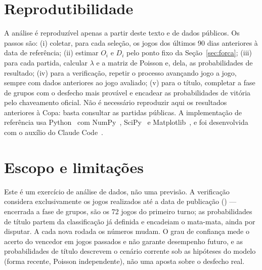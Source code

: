 \documentclass[11pt,a4paper]{article}
\begin{document}
\section{Reprodutibilidade}
A análise é reproduzível apenas a partir deste texto e de dados públicos. Os
passos são: (i) coletar, para cada seleção, os jogos dos últimos 90 dias
anteriores à data de referência; (ii) estimar $O_i$ e $D_i$ pelo ponto fixo da
Seção~\ref{sec:forca}; (iii) para cada partida, calcular $\lambda$ e a matriz de
Poisson e, dela, as probabilidades de resultado; (iv) para a verificação, repetir
o processo avançando jogo a jogo, sempre com dados anteriores ao jogo avaliado;
(v) para o título, completar a fase de grupos com o desfecho mais provável e
encadear as probabilidades de vitória pelo chaveamento oficial. Não é necessário
reproduzir aqui os resultados anteriores à Copa: basta consultar as partidas
públicas. A implementação de referência usa Python~\cite{python} com
NumPy~\cite{numpy}, SciPy~\cite{scipy} e Matplotlib~\cite{matplotlib}, e foi
desenvolvida com o auxílio do Claude Code~\cite{claudecode}.

\section{Escopo e limitações}\label{sec:escopo}
Este é um exercício de análise de dados, não uma previsão. A verificação
considera exclusivamente os jogos realizados até a data de publicação
(\dataAnalise) --- encerrada a fase de grupos, são os 72 jogos do primeiro turno;
as probabilidades de título partem da classificação já definida e encadeiam o
mata-mata, ainda por disputar. A cada nova rodada os números mudam. O grau de confiança mede o
acerto do vencedor em jogos passados e não garante desempenho futuro, e as
probabilidades de título descrevem o cenário corrente sob as hipóteses do modelo
(forma recente, Poisson independente), não uma aposta sobre o desfecho real.
\end{document}
